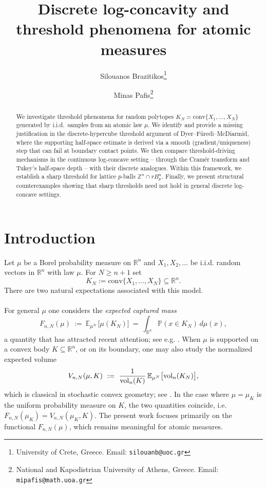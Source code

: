 \documentclass[11pt,a4paper]{article} %
\theoremstyle{definition}
\theoremstyle{remark}
\newcommand{\R}{\mathbb{R}}
\newcommand{\E}{\mathbb{E}}
\newcommand{\Prob}{\mathbb{P}}
\newcommand{\conv}{\mathrm{conv}}
\newcommand{\1}{\mathds{1}}
\newcommand{\vol}{{\rm{vol}}}
\begin{document}
\title{Discrete log-concavity and threshold phenomena for atomic measures}

\author{
  Silouanos Brazitikos\thanks{University of Crete, Greece. Email: \texttt{silouanb@uoc.gr}}
  \and
  Minas Pafis\thanks{National and Kapodistrian University of Athens, Greece. Email: \texttt{mipafis@math.uoa.gr}}
}

\date{} %

\maketitle

\begin{abstract}
We investigate threshold phenomena for random polytopes $K_N=\conv\{X_1,\dots,X_N\}$ generated by i.i.d.\ samples
from an atomic law $\mu$. We identify and provide a missing justification in the
discrete-hypercube threshold argument
of Dyer--F\"uredi--McDiarmid, where the supporting half-space estimate
is derived via a smooth (gradient/uniqueness) step
that can fail at boundary contact points. We then compare threshold-driving mechanisms in the continuous
log-concave setting -- through the Cram\'{e}r transform and Tukey's half-space depth -- with their discrete analogues. Within this framework,  we establish a sharp threshold for
lattice $p$-balls $\mathbb{Z}^n \cap rB_p^n$. Finally, we present structural counterexamples
showing that sharp thresholds need not hold in general discrete log-concave settings.
\end{abstract}

\section{Introduction}

Let $\mu$ be a Borel probability measure on $\R^n$ and $X_1,X_2,\dots$ be i.i.d. random vectors in $\mathbb{R}^n$ with law $\mu$. For $N\ge n+1$ set
\[
K_N:=\conv\{X_1,\dots,X_N\}\subseteq\R^n.
\]
There are two natural expectations associated with this model.

\paragraph{}
For general $\mu$ one considers the \emph{expected captured mass}
\[
F_{n,N}(\mu)\ :=\ \E_{\mu^N}\,\big[\mu(K_N)\big]
\ =\ \int_{\R^n}\Prob\left(x\in K_N\right)\,d\mu(x),
\]
a quantity that has attracted recent attention; see e.g. \cite{BC,BGP2,BGP,Giannop-Tziotziou,Paf}.
When $\mu$ is supported on a convex body $K\subseteq\R^n$, or on its boundary, one may also study the normalized expected volume
\[
V_{n,N}(\mu,K)\ :=\ \frac{1}{\vol_n(K)}\,\E_{\mu^N}\big[\vol_n(K_N)\big],
\]
which is classical in stochastic convex geometry; see \cite{BCGTT,BKT,CTV,DFM,FPT,GaGia,Pivov}. In the case where $\mu=\mu_K$ is the uniform probability measure on $K$, the two quantities coincide, i.e. $F_{n,N}(\mu_K)=V_{n,N}(\mu_K,K)$. The present work focuses primarily on the functional $F_{n,N}(\mu)$, which remains meaningful for atomic measures.
\end{document}
